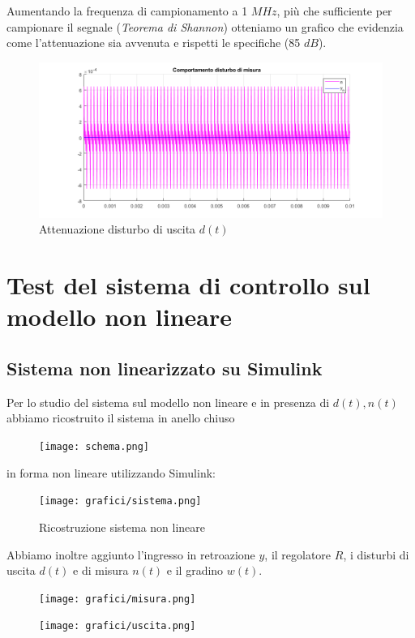 \documentclass{article}
\begin{document}
Aumentando la frequenza di campionamento a 1 $MHz$, più che sufficiente per campionare il segnale 
(\textit{Teorema di Shannon}) otteniamo un grafico che evidenzia come l'attenuazione sia avvenuta e rispetti le specifiche (85 $dB$).

\begin{figure}[!h]
\centering
\includegraphics[width=1\textwidth]{grafici/fig6.png}
\caption{\label{fig:orbit}Attenuazione disturbo di uscita $d(t)$}
\end{figure}

\pagebreak


\section{Test del sistema di controllo sul modello non lineare}

\subsection{Sistema non linearizzato su Simulink}
Per lo studio del sistema sul modello non lineare e in presenza di $d(t),n(t)$ abbiamo ricostruito il sistema in anello chiuso

\begin{figure}[!h]
\centering
\texttt{[image: schema.png]}
\end{figure}

in forma non lineare utilizzando Simulink:

\begin{figure}[!h]
\centering
\texttt{[image: grafici/sistema.png]}
\caption{\label{fig:orbit}Ricostruzione sistema non lineare}
\end{figure}
\pagebreak

Abbiamo inoltre aggiunto l'ingresso in retroazione $y$, il regolatore $R$, i disturbi di uscita
$d(t)$ e di misura $n(t)$ e il gradino $w(t)$.
\begin{figure}[!h]
   \begin{minipage}{0.60\textwidth}
     \centering
     \texttt{[image: grafici/misura.png]}
   \end{minipage}\hfill
   \begin{minipage}{0.45\textwidth}
     \centering
     \texttt{[image: grafici/uscita.png]}
   \end{minipage}
\end{figure}
\end{document}
